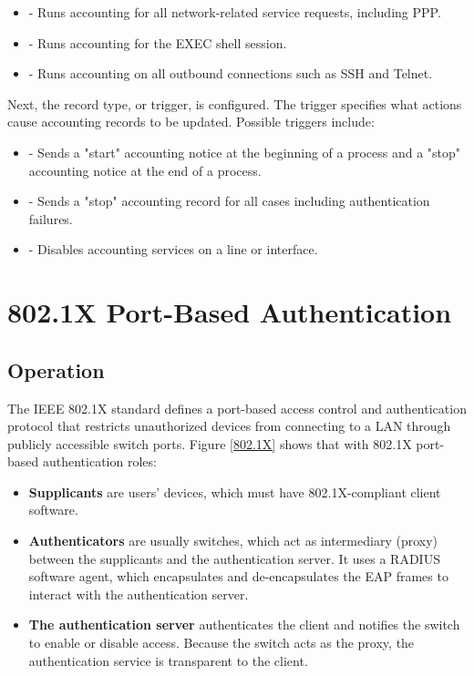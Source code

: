 \begin{itemize}
\item {} - Runs accounting for all network-related service requests, including PPP.
\item {} - Runs accounting for the EXEC shell session.
\item {} - Runs accounting on all outbound connections such as SSH and Telnet.
\end{itemize}

Next, the record type, or trigger, is configured. The trigger specifies what actions cause accounting records to be updated. Possible triggers include:

\begin{itemize}
\item {} - Sends a "start" accounting notice at the beginning of a process and a "stop" accounting notice at the end of a process.
\item {} - Sends a "stop" accounting record for all cases including authentication failures.
\item {} - Disables accounting services on a line or interface.
\end{itemize}
    

\section{802.1X Port-Based Authentication}

\subsection{Operation}

The IEEE 802.1X standard defines a port-based access control and authentication protocol that restricts unauthorized devices from connecting to a LAN through publicly accessible switch ports. Figure \ref{802.1X} shows that with 802.1X port-based authentication roles:

\begin{itemize}
\item \textbf{Supplicants} are users' devices, which must have 802.1X-compliant client software. 
\item \textbf{Authenticators} are usually switches, which act as intermediary (proxy) between the supplicants and the authentication server. It uses a RADIUS software agent, which encapsulates and de-encapsulates the EAP frames to interact with the authentication server.
\item \textbf{The authentication server} authenticates the client and notifies the switch to enable or disable access. Because the switch acts as the proxy, the authentication service is transparent to the client.
\end{itemize}

